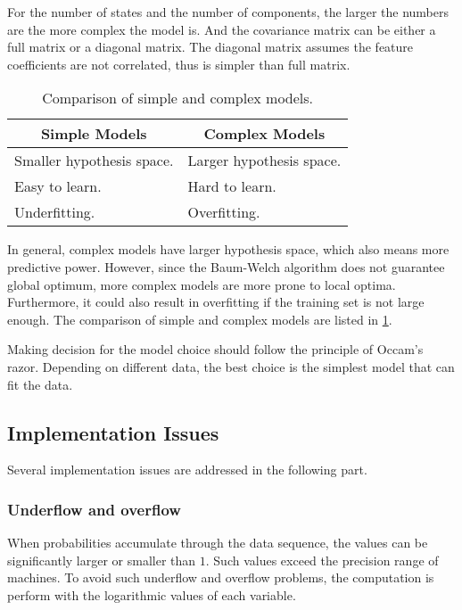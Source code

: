 \documentclass[12pt,final,twoside]{report}
\begin{document}
For the number of states and the number of components, the larger the numbers are the more complex the model is. And the covariance matrix can be either a full matrix or a diagonal matrix. The diagonal matrix assumes the feature coefficients are not correlated, thus is simpler than full matrix.

\begin{table}[t]
  \caption{Comparison of simple and complex models.}
  \label{tab:model}
  \centering
  \begin{tabular}{p{}p{}}
    \toprule
    \multicolumn{1}{c}{\bfseries Simple Models} & \multicolumn{1}{c}{\bfseries Complex Models} \\ \midrule
    Smaller hypothesis space. & Larger hypothesis space. \\
    Easy to learn. & Hard to learn. \\
    Underfitting. & Overfitting. \\
    \bottomrule
  \end{tabular}
\end{table}

In general, complex models have larger hypothesis space, which also means more predictive power. However, since the Baum-Welch algorithm does not guarantee global optimum, more complex models are more prone to local optima. Furthermore, it could also result in overfitting if the training set is not large enough. The comparison of simple and complex models are listed in \cref{tab:model}.

Making decision for the model choice should follow the principle of Occam's razor. Depending on different data, the best choice is the simplest model that can fit the data.

\subsection{Implementation Issues}
Several implementation issues are addressed in the following part.

\subsubsection{Underflow and overflow}

When probabilities accumulate through the data sequence, the values can be significantly larger or smaller than $1$. Such values exceed the precision range of machines. To avoid such underflow and overflow problems, the computation is perform with the logarithmic values of each variable. 
\end{document}

